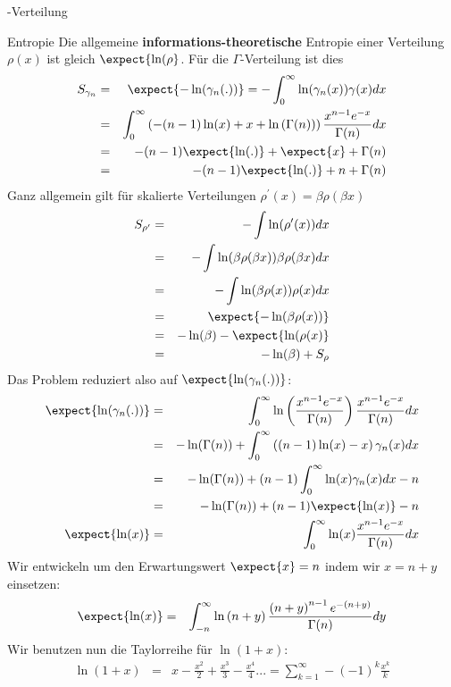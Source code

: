 \begin{chapter}{\titlestr}
\begin{appendix}
\begin{section}{\titlemath{$\Gamma$}-Verteilung}
\begin{subsection}{Entropie}
Die allgemeine \textbf{informations-theoretische} Entropie einer Verteilung $\rho(x)$ ist gleich $\expect{\ln(\rho}$.
Für die $\Gamma$-Verteilung ist dies
\begin{eqnarray*}
S_{\gamma_n} &=& \expect{-\ln(\gamma_n(.))}=-\int_0^\infty \ln(\gamma_n(x))\gamma(x)dx\\
&=& \int_0^\infty \left(-(n-1)\ln(x)+x+\ln\left(\Gamma(n)\right)\right)\frac{x^{n-1}e^{-x}}{\Gamma(n)}dx\\
&=& -(n-1)\expect{\ln(.)}+\expect{x}+\Gamma(n)\\
&=& -(n-1)\expect{\ln(.)}+n+\Gamma(n)
\end{eqnarray*}
Ganz allgemein gilt für skalierte Verteilungen $\rho^\prime(x)= \beta \rho(\beta x)$
\begin{eqnarray*}
S_{\rho^\prime} &=& -\int \ln(\rho^\prime(x))dx\\
&=& -\int \ln (\beta \rho(\beta x))\beta \rho(\beta x)dx\\
&=& -\int \ln (\beta \rho(x))\rho(x)dx\\
&=& \expect{-\ln(\beta \rho(x))}\\
&=& -\ln(\beta) - \expect{\ln(\rho(x)}\\
&=& -\ln(\beta) + S_{\rho}
\end{eqnarray*}
Das Problem reduziert also auf $\expect{\ln(\gamma_n(.))}$:
\begin{eqnarray*}
\expect{\ln(\gamma_n(.))} &=& \int_0^\infty \ln\left(\frac{x^{n-1}e^{-x}}{\Gamma(n)}\right)\frac{x^{n-1}e^{-x}}{\Gamma(n)}dx\\
&=& -\ln(\Gamma(n))+\int_0^\infty \left((n-1)\ln(x) -x\right)\gamma_n(x)dx\\
&=& -\ln(\Gamma(n))+(n-1)\int_0^\infty \ln(x)\gamma_n(x)dx-n\\
&=& -\ln(\Gamma(n))+(n-1)\expect{\ln(x)}-n\\
\expect{\ln(x)} &=& \int_0^\infty \ln(x)\frac{x^{n-1}e^{-x}}{\Gamma(n)}dx
\end{eqnarray*}
Wir entwickeln um den Erwartungswert $\expect{x} = n$ indem wir $x = n+y$ einsetzen:
\begin{eqnarray*}
\expect{\ln(x)} &=& \int_{-n}^\infty \ln\left(n+y\right)\frac{\left(n+y\right)^{n-1}e^{-\left(n+y\right)}}{\Gamma(n)}dy
\end{eqnarray*}
Wir benutzen nun die Taylorreihe für $\ln(1+x)$:
\begin{eqnarray*}
\ln(1+x) &=& x-\frac{x^2}{2}+\frac{x^3}{3}-\frac{x^4}{4}...=\sum_{k=1}^\infty -(-1)^k\frac{x^k}{k}\\

\end{eqnarray*}
\end{subsection}
\end{section}
\end{appendix}
\end{chapter}
